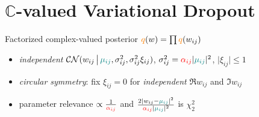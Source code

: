 \documentclass{beamer}
\newcommand{\cplx}{\mathbb{C}}
\begin{document}


\section{$\cplx$-valued Variational Dropout} %
\label{sec:extension_to_complex_parameters}
\begin{frame}[c]{\insertsection}
  Factorized complex-valued posterior $
    {\color{orange} q}(w) = \prod {\color{orange} q}(w_{ij})
  $
  \begin{itemize}
    \item \emph{independent} $
      \mathcal{CN}(
        w_{ij}\,\big\vert\,
        {\color{teal} \mu_{ij}},
        \sigma_{ij}^2,
        \sigma_{ij}^2 \xi_{ij}
      )
    $, $
      \sigma_{ij}^2
        = {\color{red} \alpha_{ij}} \lvert {\color{teal} \mu_{ij}} \rvert^2
    $, $\lvert \xi_{ij} \rvert \leq 1$

    \smallskip
    \item \emph{circular symmetry}: fix $
      \xi_{ij} = 0
    $ for \emph{independent} $\Re w_{ij}$ and $\Im w_{ij}$

    \item parameter relevance $
      \propto \frac1{{\color{red} \alpha_{ij}}}
    $ and $
      \tfrac{2 \lvert w_{ij} - {\color{teal} \mu_{ij}} \rvert^2}
            {{\color{red} \alpha_{ij}} \lvert {\color{teal} \mu_{ij}} \rvert^2}
    $ is $\chi^2_2$
  \end{itemize}


\end{frame}
\end{document}

